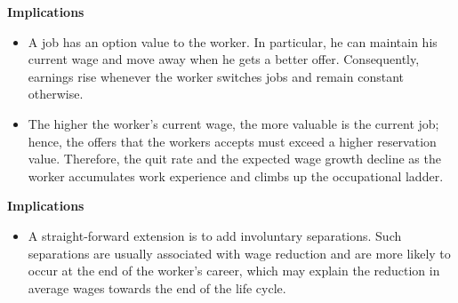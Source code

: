 \begin{frame}\textbf{Implications}\vspace{0.3cm}

\begin{itemize}\setlength\itemsep{1em}
\item A job has an option value to the worker. In particular, he can maintain his current wage and move away when he gets a better offer. Consequently, earnings rise whenever the worker switches jobs and remain constant otherwise.
\item The higher the worker's current wage, the more valuable is the current job; hence, the offers that the workers accepts must exceed a higher reservation value. Therefore, the quit rate and the expected wage growth decline as the worker accumulates work experience and climbs up the occupational ladder.
\end{itemize}

\end{frame}
\begin{frame}\textbf{Implications}\vspace{0.3cm}

\begin{itemize}\setlength\itemsep{1em}
\item A straight-forward extension is to add involuntary separations. Such separations are usually associated with wage reduction and are more likely to occur at the end of the worker's career, which may explain the reduction in average wages towards the end of the life cycle.
\end{itemize}

\end{frame}
